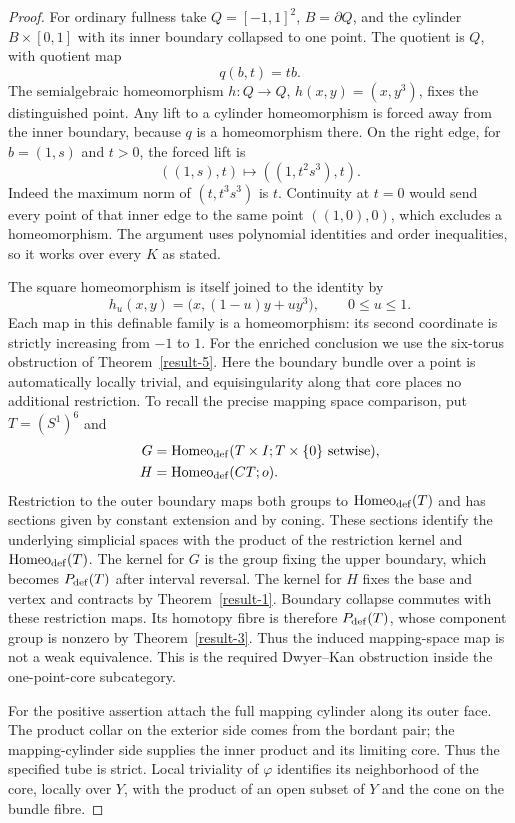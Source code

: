 \begin{proof}
For ordinary fullness take $Q=[-1,1]^2$, $B=\partial Q$, and
the cylinder $B\times[0,1]$ with its inner boundary collapsed to
one point.  The quotient is $Q$, with quotient map
\[
 q(b,t)=tb.
\]
The semialgebraic homeomorphism
$h:Q\to Q$, $h(x,y)=(x,y^3)$, fixes the distinguished point.
Any lift to a cylinder homeomorphism is forced away from the
inner boundary, because $q$ is a homeomorphism there.
On the right edge, for $b=(1,s)$ and $t>0$, the forced lift is
\[
 ((1,s),t)\longmapsto((1,t^2s^3),t).
\]
Indeed the maximum norm of $(t,t^3s^3)$ is $t$.
Continuity at $t=0$ would send every point of that inner edge to
the same point $((1,0),0)$, which excludes a homeomorphism.
The argument uses polynomial identities and order inequalities,
so it works over every $K$ as stated.

The square homeomorphism is itself joined to the identity by
\[
 h_u(x,y)=\bigl(x,(1-u)y+uy^3\bigr),\qquad0\le u\le1.
\]
Each map in this definable family is a homeomorphism: its second
coordinate is strictly increasing from $-1$ to $1$.
For the enriched conclusion we use the six-torus obstruction of
Theorem~\ref{result-5}.  Here the boundary bundle over a point is
automatically locally trivial, and equisingularity along that core
places no additional restriction.  To recall the precise mapping
space comparison, put $T=(S^1)^6$ and
\[
 \begin{split}
 G&=\operatorname{Homeo}_{\rm def}
       (T\times I;T\times\{0\}\text{ setwise}),\\
 H&=\operatorname{Homeo}_{\rm def}(CT;o).
 \end{split}
\]
Restriction to the outer boundary maps both groups to
$\operatorname{Homeo}_{\rm def}(T)$ and has sections given by
constant extension and by coning.  These sections identify the
underlying simplicial spaces with the product of the restriction
kernel and $\operatorname{Homeo}_{\rm def}(T)$.  The kernel for
$G$ is the group fixing the upper boundary, which becomes
$P_{\rm def}(T)$ after interval reversal.  The kernel for $H$
fixes the base and vertex and contracts by
Theorem~\ref{result-1}.  Boundary collapse commutes with these
restriction maps.  Its homotopy fibre is therefore
$P_{\rm def}(T)$, whose component group is nonzero by
Theorem~\ref{result-3}.  Thus the induced mapping-space map is
not a weak equivalence.  This is the required Dwyer--Kan obstruction
inside the one-point-core subcategory.

For the positive assertion attach the full mapping cylinder along
its outer face.  The product collar on the exterior side comes
from the bordant pair; the mapping-cylinder side supplies the
inner product and its limiting core.  Thus the specified tube is
strict.  Local triviality of $\varphi$ identifies its neighborhood
of the core, locally over $Y$, with the product of an open subset
of $Y$ and the cone on the bundle fibre.


\end{proof}
